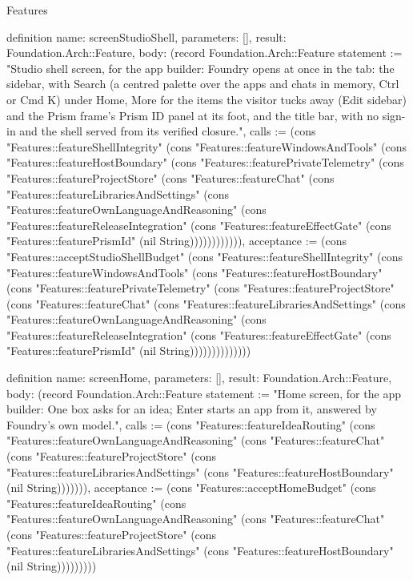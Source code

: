 \begin{lexlean}{Features}
\begin{semanticmodule}
definition{
  name: screenStudioShell,
  parameters: [],
  result: Foundation.Arch::Feature,
  body: (record Foundation.Arch::Feature {statement := "Studio shell screen, for the app builder: Foundry opens at once in the tab: the sidebar, with Search (a centred palette over the apps and chats in memory, Ctrl or Cmd K) under Home, More for the items the visitor tucks away (Edit sidebar) and the Prism frame's Prism ID panel at its foot, and the title bar, with no sign-in and the shell served from its verified closure.", calls := (cons "Features::featureShellIntegrity" (cons "Features::featureWindowsAndTools" (cons "Features::featureHostBoundary" (cons "Features::featurePrivateTelemetry" (cons "Features::featureProjectStore" (cons "Features::featureChat" (cons "Features::featureLibrariesAndSettings" (cons "Features::featureOwnLanguageAndReasoning" (cons "Features::featureReleaseIntegration" (cons "Features::featureEffectGate" (cons "Features::featurePrismId" (nil String)))))))))))), acceptance := (cons "Features::acceptStudioShellBudget" (cons "Features::featureShellIntegrity" (cons "Features::featureWindowsAndTools" (cons "Features::featureHostBoundary" (cons "Features::featurePrivateTelemetry" (cons "Features::featureProjectStore" (cons "Features::featureChat" (cons "Features::featureLibrariesAndSettings" (cons "Features::featureOwnLanguageAndReasoning" (cons "Features::featureReleaseIntegration" (cons "Features::featureEffectGate" (cons "Features::featurePrismId" (nil String)))))))))))))})
}

definition{
  name: screenHome,
  parameters: [],
  result: Foundation.Arch::Feature,
  body: (record Foundation.Arch::Feature {statement := "Home screen, for the app builder: One box asks for an idea; Enter starts an app from it, answered by Foundry's own model.", calls := (cons "Features::featureIdeaRouting" (cons "Features::featureOwnLanguageAndReasoning" (cons "Features::featureChat" (cons "Features::featureProjectStore" (cons "Features::featureLibrariesAndSettings" (cons "Features::featureHostBoundary" (nil String))))))), acceptance := (cons "Features::acceptHomeBudget" (cons "Features::featureIdeaRouting" (cons "Features::featureOwnLanguageAndReasoning" (cons "Features::featureChat" (cons "Features::featureProjectStore" (cons "Features::featureLibrariesAndSettings" (cons "Features::featureHostBoundary" (nil String))))))))})
}


\end{semanticmodule}
\end{lexlean}
